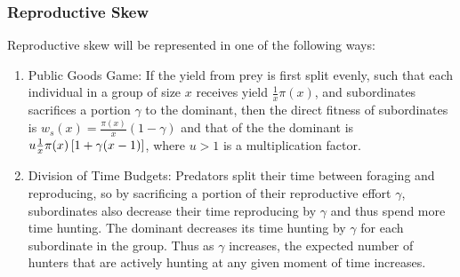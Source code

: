 \subsubsection{Reproductive Skew}
Reproductive skew will be represented in one of the following ways:
\begin{enumerate}
\item Public Goods Game: If the yield from prey is first split evenly, such that each individual in a group of size $x$ receives yield $\frac{1}{x} \pi(x)$, and subordinates sacrifices a portion $\gamma$ to the dominant, then the direct fitness of subordinates is $w_s(x) = \frac{\pi(x)}{x}(1-\gamma)$ and that of the the dominant is $u\frac{1}{x} \pi(x) \left[ 1 + \gamma(x-1) \right]$, where $u>1$ is a multiplication factor.
\item Division of Time Budgets: Predators split their time between foraging and reproducing, so by sacrificing a portion of their reproductive effort $\gamma$, subordinates also decrease their time reproducing by $\gamma$ and thus spend more time hunting. The dominant decreases its time hunting by $\gamma$ for each subordinate in the group. Thus as $\gamma$ increases, the expected number of hunters that are actively hunting at any given moment of time increases.
\end{enumerate}

